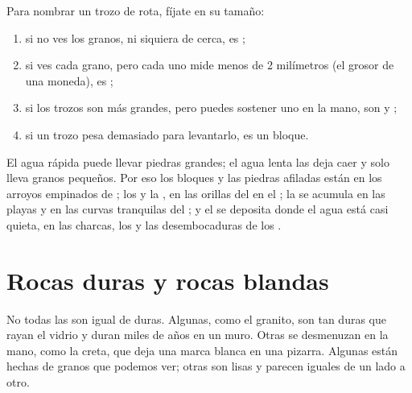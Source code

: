\begin{method}\label{met:g3:stones-pebbles-sand:sort}
Para nombrar un trozo de  rota, fíjate en su tamaño:
\begin{enumerate}
  \item si no ves los granos, ni siquiera de cerca, es ;
  \item si ves cada grano, pero cada uno mide menos de 2 milímetros (el
        grosor de una moneda), es ;
  \item si los trozos son más grandes, pero puedes sostener uno en la mano,
        son  y ;
  \item si un trozo pesa demasiado para levantarlo, es un bloque.
\end{enumerate}
\end{method}

\begin{example}\label{ex:g3:stones-pebbles-sand:where}
El agua rápida puede llevar piedras grandes; el agua lenta las deja caer y
solo lleva granos pequeños. Por eso los bloques y las piedras afiladas
están en los arroyos empinados de ; los  y la , en las
orillas del  en el ; la  se acumula en las playas y en las
curvas tranquilas del ; y el  se deposita donde el agua está casi
quieta, en las charcas, los  y las desembocaduras de los .
\end{example}

\section{Rocas duras y rocas blandas}

No todas las  son igual de duras. Algunas, como el granito, son tan
duras que rayan el vidrio y duran miles de años en un muro. Otras se
desmenuzan en la mano, como la creta, que deja una marca blanca en una
pizarra. Algunas  están hechas de granos que podemos ver; otras son
lisas y parecen iguales de un lado a otro.

